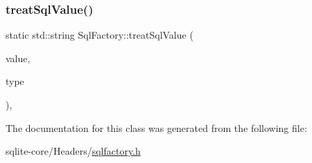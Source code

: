 \mbox{\label{classSqlFactory_a46f4bbef3a8868e711ac6a832cc4fee3}} 
\subsubsection{\texorpdfstring{treat\+Sql\+Value()}{treatSqlValue()}}
{\footnotesize\ttfamily static std\+::string Sql\+Factory\+::treat\+Sql\+Value (\begin{DoxyParamCaption}\item[{string}]{value,  }\item[{\mbox{\hyperlink{datadefinition_8h_ad06ef517a8bb3398f146f81f18988b9f}{Sql\+Type\+Enum}}}]{type }\end{DoxyParamCaption})\hspace{0.3cm}{\ttfamily [inline]}, {\ttfamily [static]}}



The documentation for this class was generated from the following file\+:\begin{DoxyCompactItemize}
\item 
sqlite-\/core/\+Headers/\mbox{\hyperlink{sqlfactory_8h}{sqlfactory.\+h}}\end{DoxyCompactItemize}
